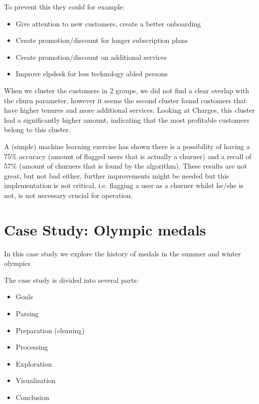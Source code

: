 \documentclass[letterpaper,10pt,english]{jupyterBook}
\begin{document}
\sphinxAtStartPar
To prevent this they could for example:
\begin{itemize}
\item {} 
\sphinxAtStartPar
Give attention to new customers, create a better onboarding

\item {} 
\sphinxAtStartPar
Create promotion/discount for longer subscription plans

\item {} 
\sphinxAtStartPar
Create promotion/discount on additional services

\item {} 
\sphinxAtStartPar
Improve elpdesk for less technology abled persons

\end{itemize}

\sphinxAtStartPar
When we cluster the customers in 2 groups, we did not find a clear overlap with the churn parameter, however it seems the second cluster found customers that have higher tenures and more additional services.
Looking at Charges, this cluster had a significantly higher amount, indicating that the most profitable customers belong to this cluster.

\sphinxAtStartPar
A (simple) machine learning exercise has shown there is a possibility of having a 75\% accuracy (amount of flagged users that is actually a churner) and a recall of 57\% (amount of churners that is found by the algorithm).
These results are not great, but not bad either, further improvements might be needed but this implementation is not critical, i.e. flagging a user as a churner whilst he/she is not, is not necessary crucial for operation.


\chapter{Case Study: Olympic medals}
\label{\detokenize{c7_case_studies/Olympics:case-study-olympic-medals}}\label{\detokenize{c7_case_studies/Olympics::doc}}
\sphinxAtStartPar
In this case study we explore the history of medals in the summer and winter olympics

\sphinxAtStartPar
The case study is divided into several parts:
\begin{itemize}
\item {} 
\sphinxAtStartPar
Goals

\item {} 
\sphinxAtStartPar
Parsing

\item {} 
\sphinxAtStartPar
Preparation (cleaning)

\item {} 
\sphinxAtStartPar
Processing

\item {} 
\sphinxAtStartPar
Exploration

\item {} 
\sphinxAtStartPar
Visualization

\item {} 
\sphinxAtStartPar
Conclusion

\end{itemize}
\end{document}
